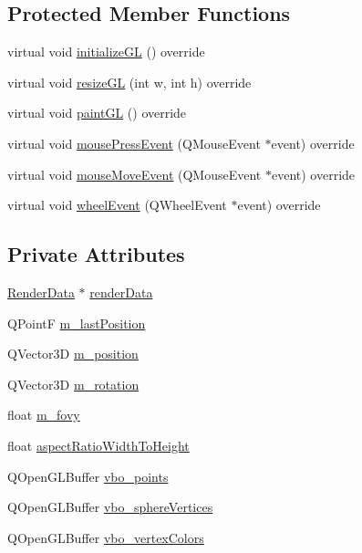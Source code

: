 \subsection*{Protected Member Functions}
\begin{DoxyCompactItemize}
\item 
virtual void \hyperlink{class_sphere_widget_a323d335cf261b7156da1a59aaf28c40c}{initialize\+GL} () override
\item 
virtual void \hyperlink{class_sphere_widget_aaf11c928f52c91d7f60317922df7ca73}{resize\+GL} (int w, int h) override
\item 
virtual void \hyperlink{class_sphere_widget_a122b798a2eb0c251f53671009abdf8c8}{paint\+GL} () override
\item 
virtual void \hyperlink{class_sphere_widget_ac658d6e1cdc99280ecff045f92fe1ba3}{mouse\+Press\+Event} (Q\+Mouse\+Event $\ast$event) override
\item 
virtual void \hyperlink{class_sphere_widget_aef63eed14a55be78015576296dce516e}{mouse\+Move\+Event} (Q\+Mouse\+Event $\ast$event) override
\item 
virtual void \hyperlink{class_sphere_widget_aaecd84d746763a4bd6f46a6d55a36d84}{wheel\+Event} (Q\+Wheel\+Event $\ast$event) override
\end{DoxyCompactItemize}
\subsection*{Private Attributes}
\begin{DoxyCompactItemize}
\item 
\hyperlink{class_render_data}{Render\+Data} $\ast$ \hyperlink{class_sphere_widget_a3b76a33d6cd44b6932cd5abfd87aa437}{render\+Data}
\item 
Q\+PointF \hyperlink{class_sphere_widget_a9c74179ab1176fd399908f8c02fb2074}{m\+\_\+last\+Position}
\item 
Q\+Vector3D \hyperlink{class_sphere_widget_a7521b0a71d5dd0d8787e041406caf5b7}{m\+\_\+position}
\item 
Q\+Vector3D \hyperlink{class_sphere_widget_a1f7581e37c8a223893db2127b8e272d7}{m\+\_\+rotation}
\item 
float \hyperlink{class_sphere_widget_a8bd9a3973094ca2bbb1481a0e8451087}{m\+\_\+fovy}
\item 
float \hyperlink{class_sphere_widget_a66eaf7bcee8035c24b53c420c93c02e8}{aspect\+Ratio\+Width\+To\+Height}
\item 
Q\+Open\+G\+L\+Buffer \hyperlink{class_sphere_widget_aba9b46a78fb5eff80d02063d4152a9d6}{vbo\+\_\+points}
\item 
Q\+Open\+G\+L\+Buffer \hyperlink{class_sphere_widget_a8c162cb7ab54e55f24ccc2c3eb8bad23}{vbo\+\_\+sphere\+Vertices}
\item 
Q\+Open\+G\+L\+Buffer \hyperlink{class_sphere_widget_a0fda2683474fcdc448cd73fb6329da8b}{vbo\+\_\+vertex\+Colors}
\end{DoxyCompactItemize}


